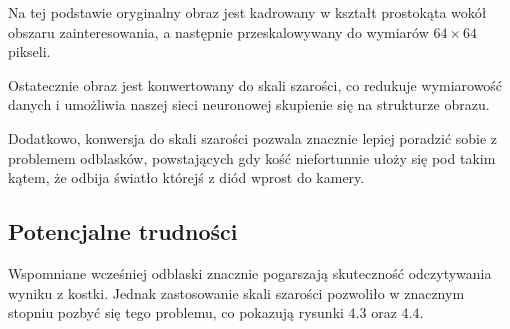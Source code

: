 Na tej podstawie oryginalny obraz jest kadrowany w kształt prostokąta wokół obszaru zainteresowania,
a następnie przeskalowywany do wymiarów $64 \times 64$ pikseli.


Ostatecznie obraz jest konwertowany do skali szarości, co redukuje wymiarowość danych
i umożliwia naszej sieci neuronowej skupienie się na strukturze obrazu.

Dodatkowo, konwersja do skali szarości pozwala znacznie lepiej poradzić sobie z problemem odblasków,
powstających gdy kość niefortunnie ułoży się pod takim kątem, że odbija światło którejś z diód wprost do kamery.

\subsection{Potencjalne trudności}

Wspomniane wcześniej odblaski znacznie pogarszają skuteczność odczytywania wyniku z kostki.
Jednak zastosowanie skali szarości pozwoliło w znacznym stopniu pozbyć się tego problemu, co pokazują rysunki 4.3 oraz 4.4.

